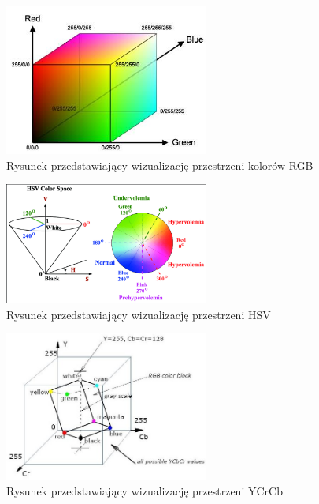 \begin{figure}[H]
    \centering
    \includegraphics[width=0.6\textwidth]{./graf/rgb-model.png}
    \caption{Rysunek przedstawiający wizualizację przestrzeni kolorów RGB \cite{bib:rgb-model}}
    \label{rys2:rgb1}
\end{figure}

\begin{figure}[h]
    \centering
    \includegraphics[width=0.6\textwidth]{./graf/hsv-model.png}
    \caption{Rysunek przedstawiający wizualizację przestrzeni HSV \cite{bib:hsv-model}}
    \label{rys2:hsv1}
\end{figure}


\begin{figure}[h]
    \centering
    \includegraphics[width=0.6\textwidth]{./graf/ycrcb-model.png}
    \caption{Rysunek przedstawiający wizualizację przestrzeni YCrCb \cite{bib:ycrcb-model}}
    \label{rys2:ycrcb1}
\end{figure}

